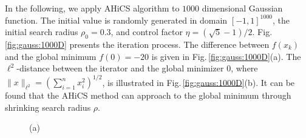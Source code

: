 \documentclass[final,1p,times]{elsarticle}
\begin{document}
In the following, we apply AHiCS algorithm to $1000$ dimensional
Gaussian function. The initial value is randomly generated in
domain $[-1,1]^{1000}$, the initial search radius $\rho_0 = 0.3$,
and control factor $\eta=(\sqrt{5}-1)/2$. 
Fig.\,\ref{fig:gauss:1000D} presents the iteration process.
The difference between $f(x_k)$ and the global minimum
$f(0)=-20$ is given in Fig.\,\ref{fig:gauss:1000D}(a). The
$\ell^2$-distance between the iterator and the global minimizer
$0$, where
$\|x\|_{\ell^2}=\left(\sum_{i=1}^n x_i^2 \right)^{1/2}$,
is illustrated in Fig.\,\ref{fig:gauss:1000D}(b). 
It can be found that the AHiCS method can approach to the global
minimum through shrinking search radius $\rho$.
\begin{figure}[!htbp]
	\begin{minipage}[b]{0.5\linewidth}
	\centerline{(a) }
	\end{minipage}
	\begin{minipage}[b]{0.5\linewidth}
	\centering{
}
\end{minipage}
\end{figure}
\end{document}

